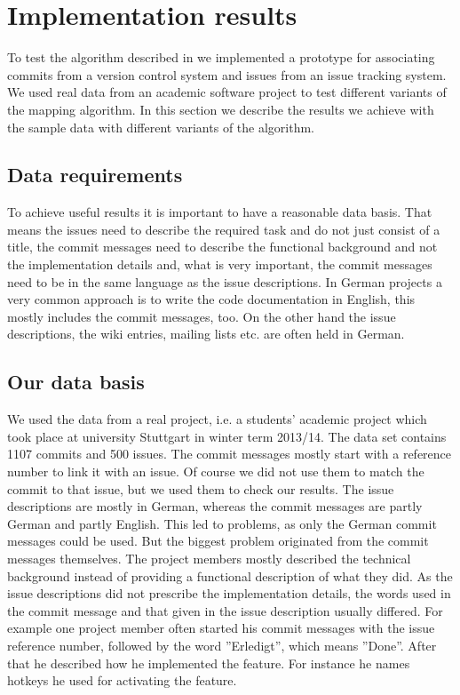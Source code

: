 \section{Implementation results}
\label{sec:implementation_results}
To test the algorithm described in  we implemented a prototype for associating commits from a version control system and issues from an issue tracking system.
We used real data from an academic software project to test different variants of the mapping algorithm.
In this section we describe the results we achieve with the sample data with different variants of the algorithm.

\subsection{Data requirements}
To achieve useful results it is important to have a reasonable data basis.
That means the issues need to describe the required task and do not just consist of a title, the commit messages need to describe the functional background and not the implementation details and, what is very important, the commit messages need to be in the same language as the issue descriptions.
In German projects a very common approach is to write the code documentation in English, this mostly includes the commit messages, too.
On the other hand the issue descriptions, the wiki entries, mailing lists etc. are often held in German.

\subsection{Our data basis}
We used the data from a real project, i.e. a students' academic project which took place at university Stuttgart in winter term 2013/14.
The data set contains 1107 commits and 500 issues.
The commit messages mostly start with a reference number to link it with an issue.
Of course we did not use them to match the commit to that issue, but we used them to check our results.
The issue descriptions are mostly in German, whereas the commit messages are partly German and partly English.
This led to problems, as only the German commit messages could be used.
But the biggest problem originated from the commit messages themselves.
The project members mostly described the technical background instead of providing a functional description of what they did.
As the issue descriptions did not prescribe the implementation details, the words used in the commit message and that given in the issue description usually differed.
For example one project member often started his commit messages with the issue reference number, followed by the word ''Erledigt'', which means ''Done''.
After that he described how he implemented the feature.
For instance he names hotkeys he used for activating the feature.

